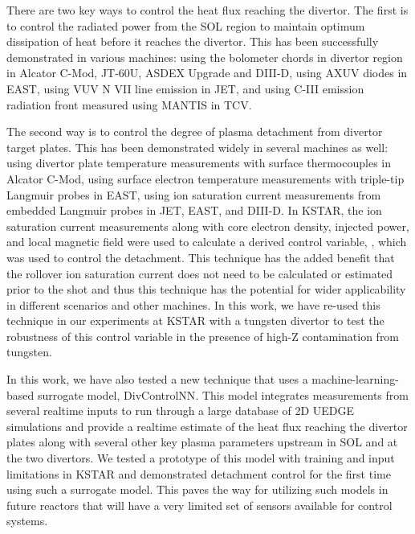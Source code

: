 There are two key ways to control the heat flux reaching the divertor.
The first is to control the radiated power from the \ac{SOL} region to maintain optimum dissipation of heat before it reaches the divertor.
This has been successfully demonstrated in various machines:
using the bolometer chords in divertor region in Alcator C-Mod\cite{Goetz_1999_POP}, JT-60U\cite{Asakura_2009_NF}, ASDEX Upgrade\cite{Kallenbach_2012_NF} and DIII-D\cite{Eldon_2019_NME},
using AXUV diodes in EAST\cite{Wu_2018_NF},
using VUV N VII line emission in JET\cite{Maddison_2011_NF}, and
using C-III emission radiation front measured using MANTIS in TCV\cite{Ravensbergen_2021_NC}.

The second way is to control the degree of plasma detachment from divertor target plates.
This has been demonstrated widely in several machines as well:
using divertor plate temperature measurements with surface thermocouples in Alcator C-Mod\cite{Brunner_2017_NF},
using surface electron temperature measurements with triple-tip Langmuir probes in EAST\cite{Eldon_2021_NME},
using ion saturation current measurements from embedded Langmuir probes in JET\cite{Guillemaut_2017_PPCF}, EAST\cite{Yuan_2020_FED}, and DIII-D\cite{Eldon_2021_NME}.
In KSTAR, the ion saturation current measurements along with core electron density, injected power, and local magnetic field were used to calculate a derived control variable, \Afrac, which was used to control the detachment\cite{Eldon_2022_PPCF}.
This technique has the added benefit that the rollover ion saturation current does not need to be calculated or estimated prior to the shot and thus this technique has the potential for wider applicability in different scenarios and other machines.
In this work, we have re-used this technique in our experiments at KSTAR with a tungsten divertor to test the robustness of this control variable in the presence of high-Z contamination from tungsten.

In this work, we have also tested a new technique that uses a machine-learning-based surrogate model, DivControlNN\cite{Zhu_2025_InPrep}.
This model integrates measurements from several realtime inputs to run through a large database of 2D UEDGE\cite{Rognlien_1999_PP} simulations and provide a realtime estimate of the heat flux reaching the divertor plates along with several other key plasma parameters upstream in \ac{SOL} and at the two divertors.
We tested a prototype of this model with training and input limitations in KSTAR and demonstrated detachment control for the first time using such a surrogate model.
This paves the way for utilizing such models in future reactors that will have a very limited set of sensors available for control systems.


